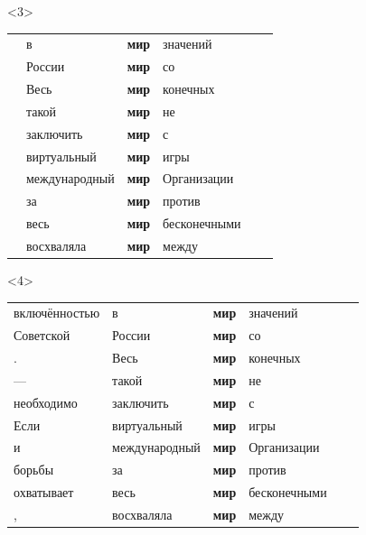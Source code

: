 \documentclass[10pt, compress]{beamer}
\begin{document}
\begin{frame}
\begin{center}
\begin{onlyenv}
\end{onlyenv}
\begin{onlyenv}<3>
\begin{tabular}{p{2.5cm}p{2.5cm}p{1.0cm}p{1.5cm}p{1.5cm}p{1.5cm}}
      & в    &  \textbf{мир}  & значений     &     & \\
      & России    &  \textbf{мир}  & со     &     & \\
      & Весь    &  \textbf{мир}  &  конечных    &     & \\
      & такой    &  \textbf{мир}  &  не    &     & \\
      & заключить    &  \textbf{мир}  & с     &     & \\
      & виртуальный    &  \textbf{мир}  & игры     &     & \\
      & международный    &  \textbf{мир}  & Организации     &     & \\
      & за    &  \textbf{мир}  & против     &     & \\
      & весь    &  \textbf{мир}  &  бесконечными    &     & \\
      & восхваляла    &  \textbf{мир}  & между     &     & \\
\end{tabular}

\end{onlyenv}
\begin{onlyenv}<4>
\begin{tabular}{p{2.5cm}p{2.5cm}p{1.0cm}p{1.5cm}p{1.5cm}p{1.5cm}}
включённостью  & в    &  \textbf{мир}  & значений     &     & \\
Советской      & России    &  \textbf{мир}  & со     &     & \\
.      & Весь    &  \textbf{мир}  &  конечных    &     & \\
—      & такой    &  \textbf{мир}  &  не    &     & \\
необходимо      & заключить    &  \textbf{мир}  & с     &     & \\
Если      & виртуальный    &  \textbf{мир}  & игры     &     & \\
и      & международный    &  \textbf{мир}  & Организации     &     & \\
борьбы      & за    &  \textbf{мир}  & против     &     & \\
охватывает      & весь    &  \textbf{мир}  &  бесконечными    &     & \\
,      & восхваляла    &  \textbf{мир}  & между     &     & \\
\end{tabular}


\end{onlyenv}
\end{center}
\end{frame}
\end{document}
